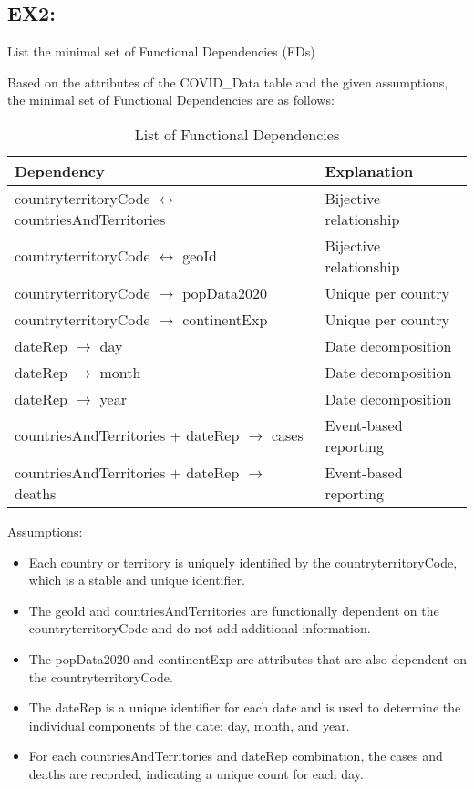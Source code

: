 \documentclass{article}
\begin{document}
\newpage
\subsection{EX2:} List the minimal set of Functional Dependencies (FDs)

\vspace{2mm}
Based on the attributes of the COVID\_Data table and the given assumptions, the minimal set of Functional Dependencies are as follows:
\vspace{1mm}

\begin{table}[htbp]
\centering
\caption{List of Functional Dependencies}
\label{tab:functional_dependencies}
\begin{tabular}{@{}ll@{}}
\toprule
\textbf{Dependency}                     & \textbf{Explanation}                                 \\ \midrule
countryterritoryCode $\leftrightarrow$ countriesAndTerritories & Bijective relationship \\
countryterritoryCode $\leftrightarrow$ geoId                    & Bijective relationship \\
countryterritoryCode $\rightarrow$ popData2020                  & Unique per country \\
countryterritoryCode $\rightarrow$ continentExp                 & Unique per country \\
dateRep $\rightarrow$ day                                       & Date decomposition \\
dateRep $\rightarrow$ month                                     & Date decomposition \\
dateRep $\rightarrow$ year                                      & Date decomposition \\
countriesAndTerritories + dateRep $\rightarrow$ cases           & Event-based reporting \\
countriesAndTerritories + dateRep $\rightarrow$ deaths          & Event-based reporting \\ \bottomrule
\end{tabular}
\end{table}

Assumptions:
\begin{itemize}
  \item Each country or territory is uniquely identified by the countryterritoryCode, which is a stable and unique identifier.
  \item The geoId and countriesAndTerritories are functionally dependent on the countryterritoryCode and do not add additional information.
  \item The popData2020 and continentExp are attributes that are also dependent on the countryterritoryCode.
  \item The dateRep is a unique identifier for each date and is used to determine the individual components of the date: day, month, and year.
  \item For each countriesAndTerritories and dateRep combination, the cases and deaths are recorded, indicating a unique count for each day.
\end{itemize}
\end{document}
